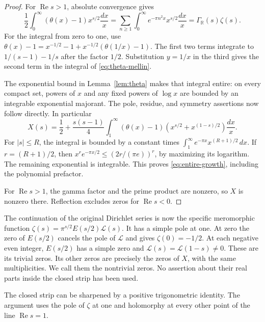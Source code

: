 \documentclass[11pt]{article}
\numberwithin{equation}{section}
\newcommand{\R}{\mathbb R}
\begin{document}
\begin{proof}
For $\operatorname{Re}s>1$, absolute convergence gives
\[
 \frac12\int_0^\infty(\theta(x)-1)x^{s/2}\frac{dx}{x}
 =\sum_{n\geq1}\int_0^\infty e^{-\pi n^2x}x^{s/2}\frac{dx}{x}
 =\Gamma_{\R}(s)\zeta(s).
\]
For the integral from zero to one, use
$\theta(x)-1=x^{-1/2}-1+x^{-1/2}(\theta(1/x)-1)$.
The first two terms integrate to $1/(s-1)-1/s$ after the factor $1/2$.
Substitution $y=1/x$ in the third gives the second term in the integral
of \eqref{eq:theta-mellin}.

The exponential bound in Lemma~\ref{lem:theta} makes that integral entire:
on every compact set, powers of $x$ and any fixed powers of $\log x$ are
bounded by an integrable exponential majorant.
The pole, residue, and symmetry assertions now follow directly.
In particular
\[
 X(s)=\frac12+\frac{s(s-1)}4
       \int_1^\infty(\theta(x)-1)
             \left(x^{s/2}+x^{(1-s)/2}\right)\frac{dx}{x}.
\]
For $|s|\leq R$, the integral is bounded by a constant times
$\int_1^\infty e^{-\pi x}x^{(R+1)/2}\,dx$.
If $r=(R+1)/2$, then
$x^r e^{-\pi x/2}\leq(2r/(\pi e))^r$, by maximizing its logarithm.
The remaining exponential is integrable.  This proves
\eqref{eq:entire-growth}, including the polynomial prefactor.

For $\operatorname{Re}s>1$, the gamma factor and the prime product are
nonzero, so $X$ is nonzero there.  Reflection excludes zeros for
$\operatorname{Re}s<0$.
\end{proof}

The continuation of the original Dirichlet series is now the specific
meromorphic function $\zeta(s)=\pi^{s/2}E(s/2)\mathcal L(s)$.
It has a simple pole at one.  At zero the zero of $E(s/2)$ cancels the
pole of $\mathcal L$ and gives $\zeta(0)=-1/2$.
At each negative even integer, $E(s/2)$ has a simple zero and
$\mathcal L(s)=\mathcal L(1-s)\ne0$.
These are its trivial zeros.  Its other zeros are precisely the zeros of
$X$, with the same multiplicities.  We call them the nontrivial zeros.
No assertion about their real parts inside the closed strip has been used.

The closed strip can be sharpened by a positive trigonometric identity.
The argument uses the pole of $\zeta$ at one and holomorphy at every
other point of the line $\operatorname{Re}s=1$.
\end{document}

